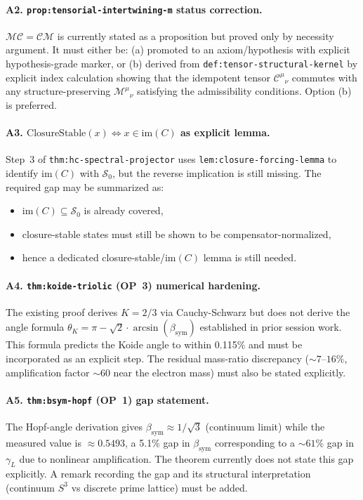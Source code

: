 \paragraph{A2. \texttt{prop:tensorial-intertwining-m} status correction.}
$\mathcal{M}\mathcal{C} = \mathcal{C}\mathcal{M}$ is currently stated as a
proposition but proved only by necessity argument. It must either be:
(a) promoted to an axiom/hypothesis with explicit hypothesis-grade marker, or
(b) derived from \texttt{def:tensor-structural-kernel} by explicit index
calculation showing that the idempotent tensor $\mathcal{C}^\mu{}_\nu$ commutes
with any structure-preserving $\mathcal{M}^\mu{}_\nu$ satisfying the
admissibility conditions. Option (b) is preferred.

\paragraph{A3. $\mathrm{ClosureStable}(x) \Leftrightarrow x \in \mathrm{im}(C)$ as
explicit lemma.}
Step~3 of \texttt{thm:hc-spectral-projector} uses \texttt{lem:closure-forcing-lemma} to identify $\mathrm{im}(C)$ with $\mathcal S_0$, but the reverse implication is still missing. The required gap may be summarized as:
\begin{itemize}[leftmargin=1.8em]
\item $\mathrm{im}(C) \subseteq \mathcal S_0$ is already covered,
\item closure-stable states must still be shown to be compensator-normalized,
\item hence a dedicated closure-stable/im$(C)$ lemma is still needed.
\end{itemize}

\paragraph{A4. \texttt{thm:koide-triolic} (OP~3) numerical hardening.}
The existing proof derives $K = 2/3$ via Cauchy-Schwarz but does not
derive the angle formula
$\theta_K = \pi - \sqrt{2}\cdot\arcsin(\beta_{\mathrm{sym}})$
established in prior session work. This formula predicts the Koide angle
to within 0.115\% and must be incorporated as an explicit step.
The residual mass-ratio discrepancy ($\sim 7$--$16\%$, amplification
factor $\sim 60$ near the electron mass) must also be stated explicitly.

\paragraph{A5. \texttt{thm:bsym-hopf} (OP~1) gap statement.}
The Hopf-angle derivation gives $\beta_{\mathrm{sym}} \approx 1/\sqrt{3}$
(continuum limit) while the measured value is $\approx 0.5493$, a 5.1\% gap
in $\beta_{\mathrm{sym}}$ corresponding to a $\sim 61\%$ gap in $\gamma_L$
due to nonlinear amplification. The theorem currently does not state this gap
explicitly. A remark recording the gap and its structural interpretation
(continuum $S^3$ vs discrete prime lattice) must be added.


